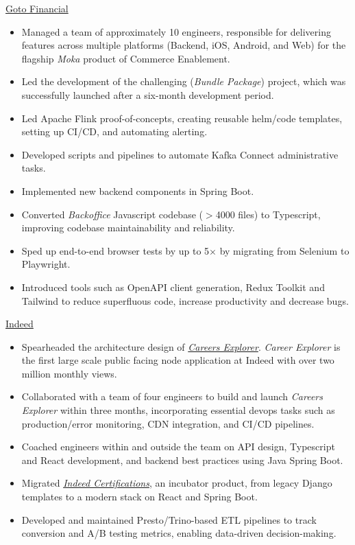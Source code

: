 \documentclass[]{cv} %
\begin{document}
\entry
{\href{https://gotofinancial.com/en}{Goto Financial}}
{
\begin{itemize}
\item Managed a team of approximately 10 engineers, responsible for delivering features across multiple platforms (Backend, iOS, Android, and Web) for the flagship \emph{Moka} product of Commerce Enablement.
\item Led the development of the challenging (\emph{Bundle Package}) project, which was successfully launched after a six-month development period.
\item Led Apache Flink proof-of-concepts, creating reusable helm/code templates, setting up CI/CD, and automating alerting.
\item Developed scripts and pipelines to automate Kafka Connect administrative tasks.
\item Implemented new backend components in Spring Boot.
\item Converted \emph{Backoffice} Javascript codebase ($> $4000 files) to Typescript, improving codebase maintainability and reliability.
\item Sped up end-to-end browser tests by up to 5$\times$ by migrating from Selenium to Playwright.
\item Introduced tools such as OpenAPI client generation, Redux Toolkit and Tailwind to reduce superfluous code, increase productivity and decrease bugs.
\end{itemize}
}

\entry
{\href{https://www.indeed.com/}{Indeed}}
{
\begin{itemize}
\item Spearheaded the architecture design of \href{https://www.indeed.com/career}{\emph{Careers Explorer}}. \emph{Career Explorer} is the first large scale public facing node application at Indeed with over two million monthly views.
\item Collaborated with a team of four engineers to build and launch \emph{Careers Explorer} within three months, incorporating essential devops tasks such as production/error monitoring, CDN integration, and CI/CD pipelines.
\item Coached engineers within and outside the team on API design, Typescript and React development, and backend best practices using Java Spring Boot.
\item Migrated \href{https://www.indeed.com/certifications/}{\emph{Indeed Certifications}}, an incubator product, from legacy Django templates to a modern stack on React and Spring Boot.
\item Developed and maintained Presto/Trino-based ETL pipelines to track conversion and A/B testing metrics, enabling data-driven decision-making.
\end{itemize}
}
\end{document}
